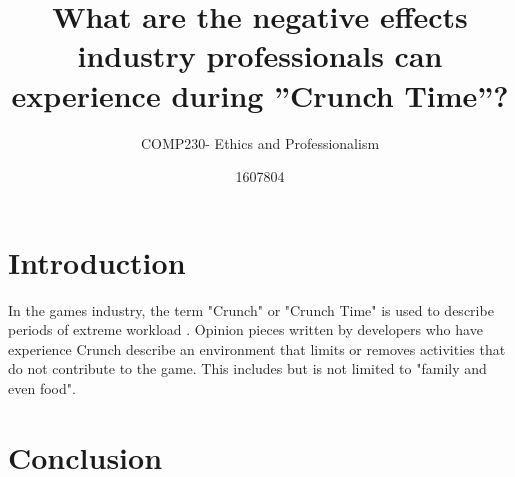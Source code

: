 \documentclass{scrartcl}
\title{What are the negative effects industry professionals can experience during ”Crunch Time”?}
\subtitle{COMP230- Ethics and Professionalism}
\author{1607804}
\begin{document}
\maketitle


\section{Introduction}
In the games industry, the term "Crunch" or "Crunch Time" is used to describe periods of extreme workload \cite[p. 468]{edholm2017crunch}. Opinion pieces written by developers who have experience Crunch describe an environment that limits or removes activities that do not contribute to the game. This includes but is not limited to "family and even food"\cite{schreier_2017}.

\section{Conclusion}



\end{document}
